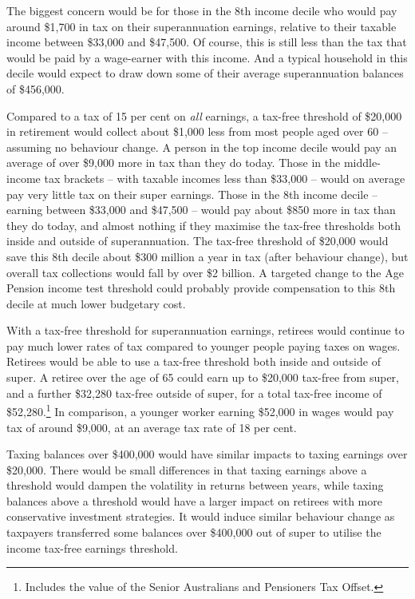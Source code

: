 \documentclass{grattanAlpha}
\begin{document}
The biggest concern would be for those in the 8th income decile who would pay around \$1,700 in tax on their superannuation earnings, relative to their taxable income between \$33,000 and \$47,500. Of course, this is still less than the tax that would be paid by a wage-earner with this income. And a typical household in this decile would expect to draw down some of their average superannuation balances of \$456,000.

Compared to a tax of 15 per cent on \emph{all} earnings, a tax-free threshold of \$20,000 in retirement would collect about \$1,000 less from most people aged over 60 – assuming no behaviour change. A person in the top income decile would pay an average of over \$9,000 more in tax than they do today. Those in the middle-income tax brackets – with taxable incomes less than \$33,000 – would on average pay very little tax on their super earnings. Those in the 8th income decile – earning between \$33,000 and \$47,500 – would pay about \$850 more in tax than they do today, and almost nothing if they maximise the tax-free thresholds both inside and outside of superannuation. The tax-free threshold of \$20,000 would save this 8th decile about \$300 million a year in tax (after behaviour change), but overall tax collections would fall by over \$2 billion. A targeted change to the Age Pension income test threshold could probably provide compensation to this 8th decile at much lower budgetary cost. 

With a tax-free threshold for superannuation earnings, retirees would continue to pay much lower rates of tax compared to younger people paying taxes on wages. Retirees would be able to use a tax-free threshold both inside and outside of super. A retiree over the age of 65 could earn up to \$20,000 tax-free from super, and a further \$32,280 tax-free outside of super, for a total tax-free income of \$52,280.\footnote{Includes the value of the Senior Australians and Pensioners Tax Offset.} In comparison, a younger worker earning \$52,000 in wages would pay tax of around \$9,000, at an average tax rate of 18 per cent.

Taxing balances over \$400,000 would have similar impacts to taxing earnings over \$20,000. There would be small differences in that taxing earnings above a threshold would dampen the volatility in returns between years, while taxing balances above a threshold would have a larger impact on retirees with more conservative investment strategies. It would induce similar behaviour change as taxpayers transferred some balances over \$400,000 out of super to utilise the income tax-free earnings threshold. 
\end{document}
